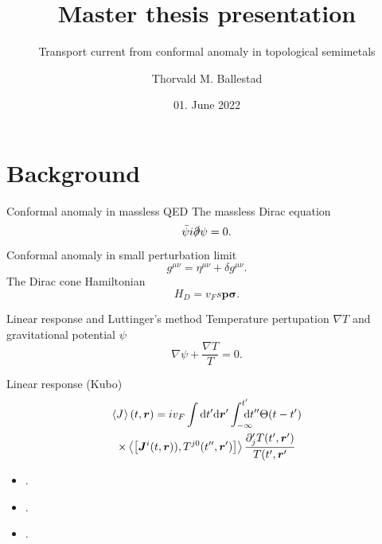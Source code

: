 \documentclass{beamer}
\author{Thorvald M. Ballestad}
\title{Master thesis presentation}
\subtitle{Transport current from conformal anomaly in topological semimetals}
\date{01. June 2022}
\renewcommand\vec\bm
\begin{document}
\begin{frame}
\titlepage
\end{frame}

\section{Background}
\begin{frame}{Conformal anomaly in massless QED}
  The massless Dirac equation
  \begin{equation}
    \label{eq:1}
    \bar{\psi} i \slashed{\partial} \psi = 0.
  \end{equation}
  Conformal anomaly in small perturbation limit
  \begin{equation}
    \label{eq:5}
    g^{\mu \nu} = \eta^{\mu \nu} + \delta g^{\mu \nu}.
  \end{equation}
  The Dirac cone Hamiltonian
  \begin{equation}
    \label{eq:2}
    H_D = v_F s \vec{p} \vec{\sigma}.
  \end{equation}
\end{frame}

\begin{frame}{Linear response and Luttinger's method}
  Temperature pertupation \( \nabla T \) and gravitational potential \( \psi \)
  \begin{equation}
    \label{eq:3}
    \nabla \psi + \frac{\nabla T}{T} = 0.
  \end{equation}


  Linear response (Kubo)
  \begin{multline}
    \label{eq:4}
    \Braket{J^{}}(t, \vec{r}) =
    iv_F
    \int \mathrm{d}t' \mathrm{d} \vec{r}'
    \int_{-\infty}^{t'} \hspace{-1em} \mathrm{d}t''
    \Theta(t-t')\\
    \times
    \Braket{\left[
      \vec{J}^i(t, \vec{r})), T^{j0}(t'', \vec{r}')
\right      ]}
\frac{\partial_j' T(t', \vec{r}')}{T(t', \vec{r}'}
  \end{multline}
\end{frame}

\begin{frame}
  \begin{itemize}
  \item{}.
  \item{}.
  \item{}.
  \end{itemize}
\end{frame}
\end{document}
